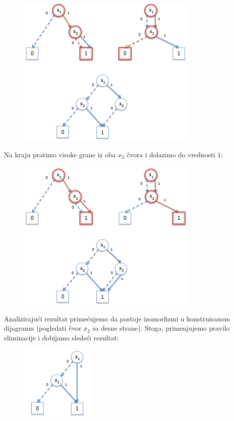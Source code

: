 \begin{exmp}
    \begin{figure}[H]
        \centering
        \includegraphics{slike/ROBDD_primer_6.PNG}
    \end{figure}

    Na kraju pratimo visoke grane iz oba $x_{2}$ \v{c}vora i dolazimo do vrednosti $1$:

    \begin{figure}[H]
        \centering
        \includegraphics{slike/ROBDD_primer_7.PNG}
    \end{figure}

    Analiziraju\'c{}i rezultat prime\'c{}ujemo da postoje izomorfizmi u konstruisanom dijagramu (pogledati \v{c}vor $x_{2}$ sa desne strane). Stoga, primenjujemo pravilo eliminacije i dobijamo slede\'c{}i rezultat:

    \begin{figure}[H]
        \centering
        \includegraphics{slike/ROBDD_primer_8.PNG}
    \end{figure}


\end{exmp}
